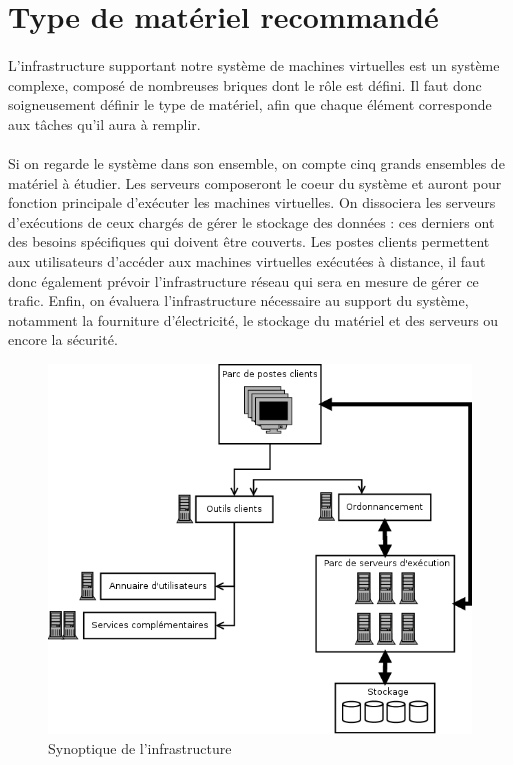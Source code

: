 \section{Type de matériel recommandé}

\paragraph{} L'infrastructure supportant notre système de machines virtuelles
est un système complexe, composé de nombreuses briques dont le rôle est défini.
Il faut donc soigneusement définir le type de matériel, afin que chaque élément
corresponde aux tâches qu'il aura à remplir.

\paragraph{} Si on regarde le système dans son ensemble, on compte cinq grands
ensembles de matériel à étudier. Les serveurs composeront le coeur du
système et auront pour fonction principale d'exécuter les machines virtuelles.
On dissociera les serveurs d'exécutions de ceux chargés de gérer le stockage des
données : ces derniers ont des besoins spécifiques qui doivent être couverts.
Les postes clients permettent aux utilisateurs d'accéder aux machines virtuelles
exécutées à distance, il faut donc également prévoir l'infrastructure réseau qui
sera en mesure de gérer ce trafic. Enfin, on évaluera l'infrastructure
nécessaire au support du système, notamment la fourniture d'électricité, le
stockage du matériel et des serveurs ou encore la sécurité.

\begin{figure}[h]
  \caption{\label{archi_materiel} Synoptique de l'infrastructure}
  \includegraphics[scale=0.6]{archi_materiel.png}
\end{figure}

